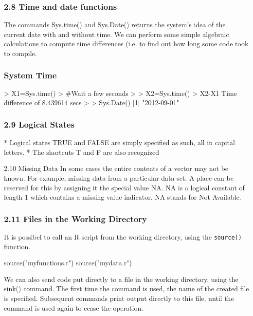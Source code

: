  
 
 \frametitle{2.8 Time and date functions}
 The commands Sys.time() and Sys.Date() returns the system’s idea of the current date
 with and without time. We can perform some simple algebraic calculations to compute time
 differences (i.e. to find out how long some code took to compile.
 
 
 
 \frametitle{System Time}
 \begin{framed}
 \begin{semiverbatim}
 > X1=Sys.time()
 > #Wait a few seconds
 >
 > X2=Sys.time()
 > X2-X1 Time difference of 8.439614 secs
 >
 > Sys.Date() [1] "2012-09-01"
 \end{semiverbatim}
 \end{framed}
 
 
 \frametitle{2.9 Logical States}
 
*  Logical states TRUE and FALSE are simply specified as such, all in capital letters. 
*  The
 shortcuts T and F are also recognized

 
 
 
 
 2.10 Missing Data
 In some cases the entire contents of a vector may not be known. For example, missing data
 from a particular data set. A place can be reserved for this by assigning it the special value
 NA.
 NA is a logical constant of length 1 which contains a missing value indicator. NA stands
 for Not Available.
 
 
 
 
 \frametitle{2.11 Files in the Working Directory}
 It is possibel to call an R script from the working directory, using the \texttt{source()} function.
 \begin{framed}
 \begin{semiverbatim}
 source("myfunctions.r")
 source("mydata.r")
 \end{semiverbatim}
 \end{framed}
 We can also send code put directly to a file in the working directory, using the sink()
 command. The first time the command is used, the name of the created file is specified.
 Subsequent commands print output directly to this file, until the command is used again to
 cease the operation.
 
